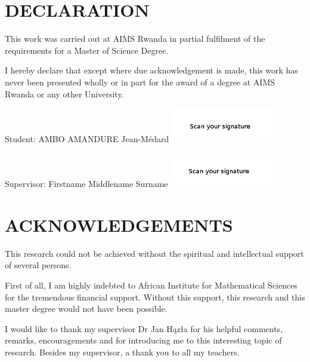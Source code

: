 \chapter*{DECLARATION}
This work was carried out at AIMS Rwanda in partial fulfilment of the requirements for a Master of Science Degree.

I hereby declare that except where due acknowledgement is made, this work has never been presented wholly or in part for the award of a degree at AIMS Rwanda or any other University.

\vspace{1.5cm}
Student: AMBO AMANDURE Jean-Médard  \includegraphics[height=1.5cm]{images/signature.png}

\vspace{1.5cm}

Supervisor: Firstname Middlename Surname \includegraphics[height=1.5cm]{images/signature1.png}


\newpage

\chapter*{ACKNOWLEDGEMENTS}


This research could not be achieved without the spiritual and intellectual support of several persons.

First of all, I am highly indebted to African Institute for Mathematical Sciences for  the tremendous  financial support. Without this support,  this research and this master degree would not have been possible.

I would like to thank my supervisor Dr Jan H{\k{a}}z{\l}a for his helpful comments, remarks, encouragements and for introducing me to this interesting topic of research. Besides my supervisor, a thank you to all my teachers.

